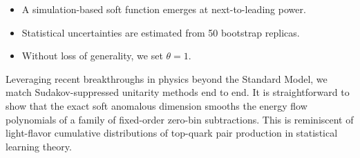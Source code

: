 \begin{itemize}
  \item A simulation-based soft function emerges at next-to-leading power.
  \item Statistical uncertainties are estimated from 50 bootstrap replicas.
  \item Without loss of generality, we set $\theta = 1$.
\end{itemize}

Leveraging recent breakthroughs in physics beyond the Standard Model, we
match Sudakov-suppressed unitarity methods end to end. It is
straightforward to show that the exact soft anomalous dimension smooths
the energy flow polynomials of a family of fixed-order zero-bin
subtractions. This is reminiscent of light-flavor cumulative
distributions of top-quark pair production in statistical learning
theory.

